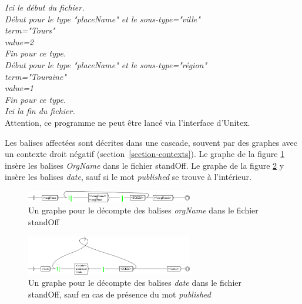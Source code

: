 \bigskip
\noindent \emph{Ici le début du fichier.}\\
\hspace*{1cm} \emph{Début pour le type "placeName" et le sous-type="ville"} \\
\hspace*{1cm} \hspace*{1cm} \emph{term="Tours"} \\
\hspace*{1cm} \hspace*{1cm} \emph{value=2} \\
\hspace*{1cm} \emph{Fin pour ce type.}\\
\hspace*{1cm} \emph{Début pour le type "placeName" et le sous-type="région"} \\
\hspace*{1cm} \hspace*{1cm} \emph{term="Touraine"} \\
\hspace*{1cm} \hspace*{1cm} \emph{value=1} \\
\hspace*{1cm} \emph{Fin pour ce type.}\\
\emph{Ici la fin du fichier.}\\

\noindent Attention, ce programme ne peut être lancé via l'interface d'Unitex.


Les balises affectées sont décrites dans une cascade, souvent par des graphes avec un contexte droit négatif (section~\ref{section-contexts}). Le graphe de la figure \ref{standOffOrgName} insère les balises \emph{OrgName} dans le fichier standOff. Le graphe de la figure \ref{standOffDate} y insère les balises \emph{date}, sauf si le mot \emph{published} se trouve à l'intérieur.


\begin{figure}[!htb]
  \centering
  \includegraphics[width=7.28cm]{resources/img/grfOrgName.png}
  \caption{Un graphe pour le décompte des balises \emph{orgName} dans le fichier standOff}
  \label{standOffOrgName}
\end{figure}


\begin{figure}[!htb]
  \centering
  \includegraphics[width=7.28cm]{resources/img/grfDate.png}
  \caption{Un graphe pour le décompte des balises \emph{date} dans le fichier standOff, sauf en cas de présence du mot \emph{published}}
  \label{standOffDate}
\end{figure}
